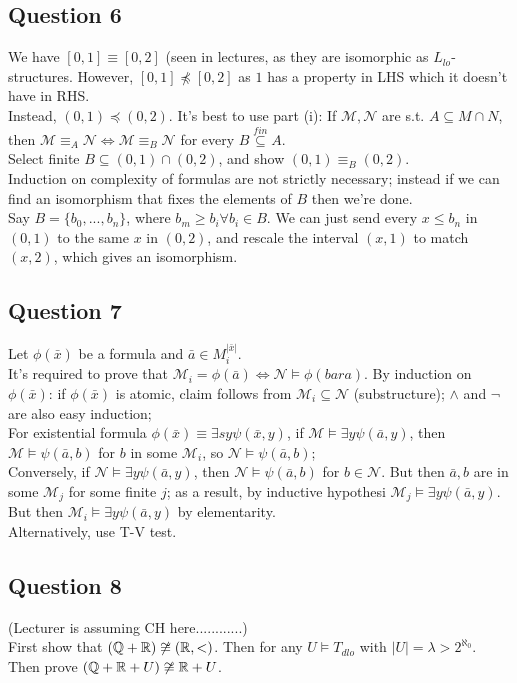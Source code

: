 \documentclass[a4paper]{article}
\begin{document}
\subsection{Question 6}
We have $[0,1] \equiv [0,2]$ (seen in lectures, as they are isomorphic as $L_{lo}$-structures. However, $[0,1] \not\preccurlyeq [0,2]$ as $1$ has a property in LHS which it doesn't have in RHS.\\
Instead, $(0,1) \preccurlyeq (0,2)$. It's best to use part (i): If $\mathcal{M},\mathcal{N}$ are s.t. $A \subseteq M \cap N$, then $\mathcal{M} \equiv_A \mathcal{N} \iff \mathcal{M} \equiv_B \mathcal{N}$ for every $B \stackrel{fin}{\subseteq} A$.\\
Select finite $B \subseteq (0,1) \cap (0,2)$, and show $(0,1) \equiv_B (0,2)$.\\
Induction on complexity of formulas are not strictly necessary; instead if we can find an isomorphism that fixes the elements of $B$ then we're done.\\
Say $B =\{b_0,...,b_n\}$, where $b_m \geq b_i \forall b_i \in B$. We can just send every $x \leq b_n$ in $(0,1)$ to the same $x$ in $(0,2)$, and rescale the interval $(x,1)$ to match $(x,2)$, which gives an isomorphism.\\

\subsection{Question 7}
Let $\phi(\bar{x})$ be a formula and $\bar{a} \in M_i^{|\bar{x}|}$.\\
It's required to prove that $\mathcal{M}_i = \phi(\bar{a}) \iff \mathcal{N} \vDash \phi(bar{a})$. By induction on $\phi(\bar{x})$: if $\phi(\bar{x})$ is atomic, claim follows from $\mathcal{M}_i \subseteq \mathcal{N}$ (substructure); $\wedge$ and $\neg$ are also easy induction;\\
For existential formula $\phi(\bar{x}) \equiv \exists sy \psi(\bar{x},y)$, if $\mathcal{M} \vDash \exists y \psi(\bar{a},y)$, then $\mathcal{M} \vDash \psi(\bar{a},b)$ for $b$ in some $\mathcal{M}_i$, so $\mathcal{N} \vDash \psi(\bar{a},b)$;\\
Conversely, if $\mathcal{N} \vDash \exists y \psi(\bar{a},y)$, then $\mathcal{N} \vDash \psi(\bar{a},b)$ for $b \in \mathcal{N}$. But then $\bar{a},b$ are in some $\mathcal{M}_j$ for some finite $j$; as a result, by inductive hypothesi $\mathcal{M}_j \vDash \exists y \psi (\bar{a},y)$.\\
But then $\mathcal{M}_i \vDash \exists y \psi(\bar{a},y)$ by elementarity.\\
Alternatively, use T-V test.

\subsection{Question 8}
(Lecturer is assuming CH here............)\\
First show that $(\mathbb{Q}+\mathbb{R}) \not\cong (\mathbb{R},<)$. Then for any $U \vDash T_{dlo}$ with $|U| = \lambda > 2^{\aleph_0}$. Then prove $(\mathbb{Q}+\mathbb{R}+U) \not\cong \mathbb{R}+U$.
\end{document}
